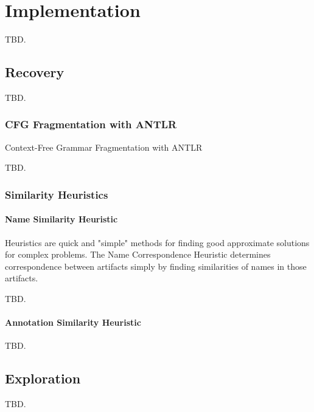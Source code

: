 \chapter{Implementation}
TBD.

\section{Recovery}
TBD.

\subsection{CFG Fragmentation with ANTLR}
Context-Free Grammar Fragmentation with \acrshort{ANTLR}

TBD.

\subsection{Similarity Heuristics}

\subsubsection{Name Similarity Heuristic}
Heuristics are quick and "simple" methods for finding good approximate solutions for complex problems.
The Name Correspondence Heuristic determines correspondence between artifacts simply by finding similarities of names in those artifacts. 

TBD.

\subsubsection{Annotation Similarity Heuristic}
TBD.

\section{Exploration}
TBD.